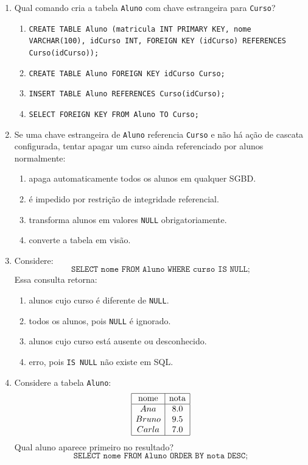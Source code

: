 \documentclass[12pt,a4paper]{article}
\begin{document}
\begin{enumerate}[resume,label=\textbf{Q\arabic*.}]
\item Qual comando cria a tabela \texttt{Aluno} com chave estrangeira para \texttt{Curso}?

\begin{enumerate}[label=\alph*)]
    \item \texttt{CREATE TABLE Aluno (matricula INT PRIMARY KEY, nome VARCHAR(100), idCurso INT, FOREIGN KEY (idCurso) REFERENCES Curso(idCurso));}
    \item \texttt{CREATE TABLE Aluno FOREIGN KEY idCurso Curso;}
    \item \texttt{INSERT TABLE Aluno REFERENCES Curso(idCurso);}
    \item \texttt{SELECT FOREIGN KEY FROM Aluno TO Curso;}
\end{enumerate}

\item Se uma chave estrangeira de \texttt{Aluno} referencia \texttt{Curso} e não há ação de cascata configurada, tentar apagar um curso ainda referenciado por alunos normalmente:

\begin{enumerate}[label=\alph*)]
    \item apaga automaticamente todos os alunos em qualquer SGBD.
    \item é impedido por restrição de integridade referencial.
    \item transforma alunos em valores \texttt{NULL} obrigatoriamente.
    \item converte a tabela em visão.
\end{enumerate}

\item Considere:
\[
\texttt{SELECT nome FROM Aluno WHERE curso IS NULL;}
\]
Essa consulta retorna:

\begin{enumerate}[label=\alph*)]
    \item alunos cujo curso é diferente de \texttt{NULL}.
    \item todos os alunos, pois \texttt{NULL} é ignorado.
    \item alunos cujo curso está ausente ou desconhecido.
    \item erro, pois \texttt{IS NULL} não existe em SQL.
\end{enumerate}

\item Considere a tabela \texttt{Aluno}:
\[
\begin{array}{|c|c|}
\hline
\text{nome} & \text{nota}\\
\hline
Ana & 8.0\\
Bruno & 9.5\\
Carla & 7.0\\
\hline
\end{array}
\]
Qual aluno aparece primeiro no resultado?
\[
\texttt{SELECT nome FROM Aluno ORDER BY nota DESC;}
\]


\end{enumerate}
\end{document}
